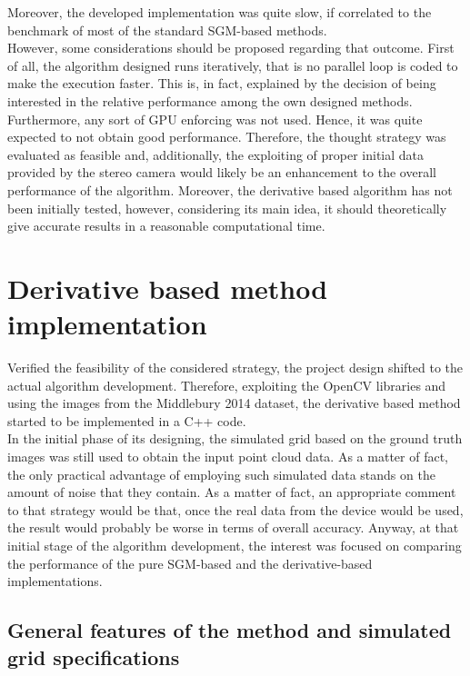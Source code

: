 Moreover, the developed implementation was quite slow, if correlated to the benchmark of most of the standard SGM-based methods. \\
However, some considerations should be proposed regarding that outcome. 
First of all, the algorithm designed runs iteratively, that is no parallel loop is coded to make the execution faster.  
This is, in fact, explained by the decision of being interested in the relative performance among the own designed methods. 
Furthermore, any sort of GPU enforcing was not used. 
Hence, it was quite expected to not obtain good performance.
Therefore, the thought strategy was evaluated as feasible and, additionally, the exploiting of proper initial data provided by the stereo camera would likely be an enhancement to the overall performance of the algorithm. 
Moreover, the derivative based algorithm has not been initially tested, however, considering its main idea, it should theoretically give accurate results in a reasonable computational time.

\section{Derivative based method implementation}
\label{section:derivative-based}

Verified the feasibility of the considered strategy, the project design shifted to the actual algorithm development. 
Therefore, exploiting the OpenCV libraries and using the images from the Middlebury 2014 dataset, the derivative based method started to be implemented in a C++ code. \\
In the initial phase of its designing, the simulated grid based on the ground truth images was still used to obtain the input point cloud data.
As a matter of fact, the only practical advantage of employing such simulated data stands on the amount of noise that they contain.
As a matter of fact, an appropriate comment to that strategy would be that, once the real data from the device would be used, the result would probably be worse in terms of overall accuracy. 
Anyway, at that initial stage of the algorithm development, the interest was focused on comparing the performance of the pure SGM-based and the derivative-based implementations. 

\subsection{General features of the method and simulated grid specifications}
\label{subsection:general-feature-der-method}

